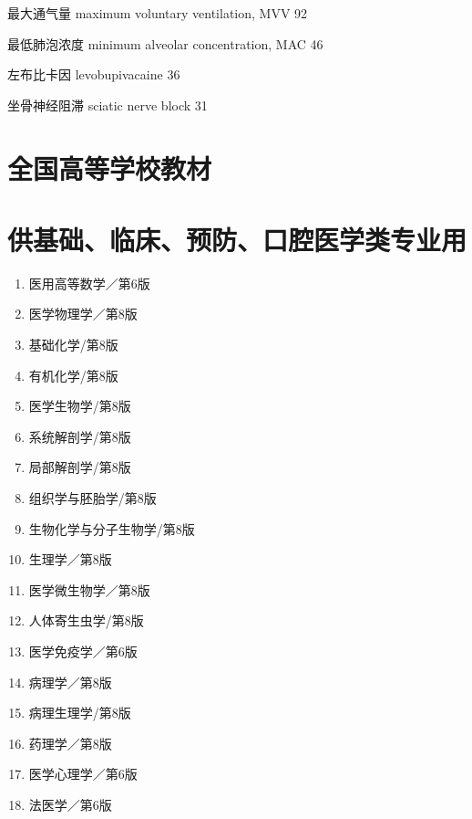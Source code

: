 \documentclass[10pt]{article}
\begin{document}
最大通气量 maximum voluntary ventilation, MVV 92

最低肺泡浓度 minimum alveolar concentration, MAC 46

左布比卡因 levobupivacaine 36

坐骨神经阻滞 sciatic nerve block 31

\section*{全国高等学校教材}
\section*{供基础、临床、预防、口腔医学类专业用}
\begin{enumerate}
  \item 医用高等数学／第6版

  \item 医学物理学／第8版

  \item 基础化学/第8版

  \item 有机化学/第8版

  \item 医学生物学/第8版

  \item 系统解剖学/第8版

  \item 局部解剖学/第8版

  \item 组织学与胚胎学/第8版

  \item 生物化学与分子生物学/第8版

  \item 生理学／第8版

  \item 医学微生物学／第8版

  \item 人体寄生虫学/第8版

  \item 医学免疫学／第6版

  \item 病理学／第8版

  \item 病理生理学/第8版

  \item 药理学／第8版

  \item 医学心理学／第6版

  \item 法医学／第6版


\end{enumerate}
\end{document}
